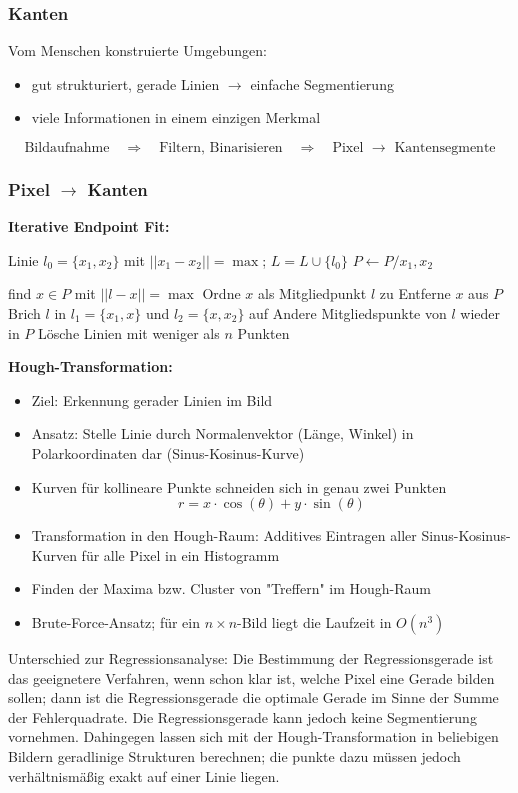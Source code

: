 \subsubsection{Kanten}

Vom Menschen konstruierte Umgebungen:
\begin{itemize}
\item gut strukturiert, gerade Linien $\to$ einfache Segmentierung
\item viele Informationen in einem einzigen Merkmal
\end{itemize}
$$\textrm{Bildaufnahme} \quad \Rightarrow \quad \textrm{Filtern, Binarisieren} \quad \Rightarrow \quad \textrm{Pixel } \to \textrm{ Kantensegmente}$$

\subsubsection*{Pixel $\to$ Kanten}

\textbf{Iterative Endpoint Fit:} \\[0,1cm]

\begin{algorithmic}
	\State Linie $l_0 = \{x_1,x_2\}$ mit $||x_1 - x_2|| = \max$; $L=L \cup \{l_0\}$
	\State $P \gets P / {x_1, x_2}$
	
		\State find $x \in P$ mit $||l-x|| = \max$
			\State Ordne $x$ als Mitgliedpunkt $l$ zu
			\State Entferne $x$ aus $P$
		\Else
			\State Brich $l$ in $l_1 = \{ x_1 , x\}$ und $l_2 = \{x , x_2 \}$ auf
			\State Andere Mitgliedspunkte von $l$ wieder in $P$	
		\EndIf
	\EndFor
	\EndWhile
	\State Lösche Linien mit weniger als $n$ Punkten
\end{algorithmic}


\textbf{Hough-Transformation:}
\begin{itemize}
\item Ziel: Erkennung gerader Linien im Bild
\item Ansatz: Stelle Linie durch Normalenvektor (Länge, Winkel) in Polarkoordinaten dar (Sinus-Kosinus-Kurve)
\item Kurven für kollineare Punkte schneiden sich in genau zwei Punkten $$r = x \cdot \cos(\theta) + y \cdot \sin(\theta)$$
\item Transformation in den Hough-Raum: Additives Eintragen aller Sinus-Kosinus-Kurven für alle Pixel in ein Histogramm
\item Finden der Maxima bzw. Cluster von "{}Treffern"{} im Hough-Raum
\item Brute-Force-Ansatz; für ein $n \times n$-Bild liegt die Laufzeit in $O(n^3)$
\end{itemize}
Unterschied zur Regressionsanalyse: Die Bestimmung der Regressionsgerade ist das geeignetere Verfahren, wenn schon klar ist, welche Pixel eine Gerade bilden sollen; dann ist die Regressionsgerade die optimale Gerade im Sinne der Summe der Fehlerquadrate. Die Regressionsgerade kann jedoch keine Segmentierung vornehmen. Dahingegen lassen sich mit der Hough-Transformation in beliebigen Bildern geradlinige Strukturen berechnen; die punkte dazu müssen jedoch verhältnismäßig exakt auf einer Linie liegen.

